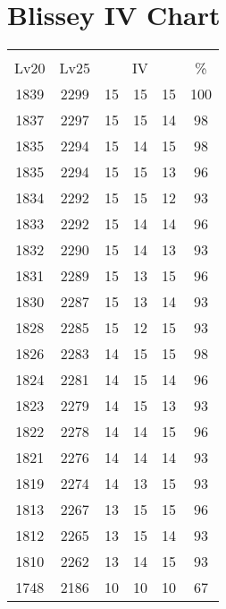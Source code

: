 \documentclass{article}%
\begin{document}
%
\normalsize%
\section{Blissey IV Chart}%
\label{sec:Blissey IV Chart}%
\renewcommand{\arraystretch}{1.5}%
\begin{tabular}{|c|c|c|c|c|c|}%
\hline%
\multicolumn{6}{|c|}{\textcolor{white}{ 
\linebreak{Blissey}
}%
\cellcolor{black}}\\%
\multicolumn{1}{|c}{Lv20}&\multicolumn{1}{c|}{Lv25}&\multicolumn{3}{c|}{IV}&\multicolumn{1}{|c|}{\%}\\%
\hline%
\rowcolor{color100}%
1839&2299&15&15&15&100\\%
\hline%
\rowcolor{color98}%
1837&2297&15&15&14&98\\%
\hline%
\rowcolor{color98}%
1835&2294&15&14&15&98\\%
\hline%
\rowcolor{color96}%
1835&2294&15&15&13&96\\%
\hline%
\rowcolor{color93}%
1834&2292&15&15&12&93\\%
\hline%
\rowcolor{color96}%
1833&2292&15&14&14&96\\%
\hline%
\rowcolor{color93}%
1832&2290&15&14&13&93\\%
\hline%
\rowcolor{color96}%
1831&2289&15&13&15&96\\%
\hline%
\rowcolor{color93}%
1830&2287&15&13&14&93\\%
\hline%
\rowcolor{color93}%
1828&2285&15&12&15&93\\%
\hline%
\rowcolor{color98}%
1826&2283&14&15&15&98\\%
\hline%
\rowcolor{color96}%
1824&2281&14&15&14&96\\%
\hline%
\rowcolor{color93}%
1823&2279&14&15&13&93\\%
\hline%
\rowcolor{color96}%
1822&2278&14&14&15&96\\%
\hline%
\rowcolor{color93}%
1821&2276&14&14&14&93\\%
\hline%
\rowcolor{color93}%
1819&2274&14&13&15&93\\%
\hline%
\rowcolor{color96}%
1813&2267&13&15&15&96\\%
\hline%
\rowcolor{color93}%
1812&2265&13&15&14&93\\%
\hline%
\rowcolor{color93}%
1810&2262&13&14&15&93\\%
\hline%
\rowcolor{color91}%
1748&2186&10&10&10&67\\%
\end{tabular}

%
\end{document}
